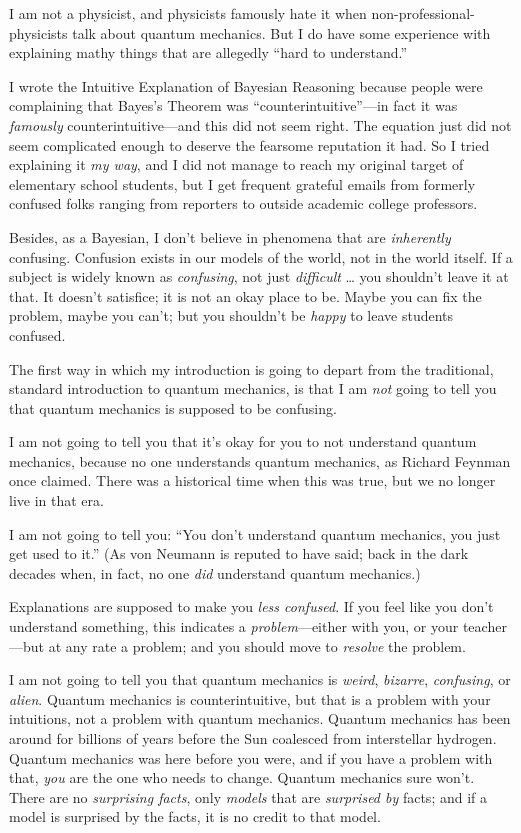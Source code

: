 {
 I am not a physicist, and physicists famously hate it when
non-professional-physicists talk about quantum mechanics. But I do have
some experience with explaining mathy things that are allegedly
``hard to understand.''}

{
 I wrote the Intuitive Explanation of Bayesian Reasoning because
people were complaining that Bayes's Theorem was
``counterintuitive''---in fact it
was \textit{famously} counterintuitive---and this did not seem right.
The equation just did not seem complicated enough to deserve the
fearsome reputation it had. So I tried explaining it \textit{my way},
and I did not manage to reach my original target of elementary school
students, but I get frequent grateful emails from formerly confused
folks ranging from reporters to outside academic college professors.}

{
 Besides, as a Bayesian, I don't believe in
phenomena that are \textit{inherently} confusing. Confusion exists in
our models of the world, not in the world itself. If a subject is
widely known as \textit{confusing}, not just \textit{difficult} \ldots
you shouldn't leave it at that. It
doesn't satisfice; it is not an okay place to be. Maybe
you can fix the problem, maybe you can't; but you
shouldn't be \textit{happy} to leave students
confused.}

{
 The first way in which my introduction is going to depart from the
traditional, standard introduction to quantum mechanics, is that I am
\textit{not} going to tell you that quantum mechanics is supposed to be
confusing.}

{
 I am not going to tell you that it's okay for you
to not understand quantum mechanics, because no one understands quantum
mechanics, as Richard Feynman once claimed. There was a historical time
when this was true, but we no longer live in that era.}

{
 I am not going to tell you: ``You
don't understand quantum mechanics, you just get used
to it.'' (As von Neumann is reputed to have said;
back in the dark decades when, in fact, no one \textit{did} understand
quantum mechanics.)}

{
 Explanations are supposed to make you \textit{less confused}. If
you feel like you don't understand something, this
indicates a \textit{problem}{}---either with you, or your teacher---but
at any rate a problem; and you should move to \textit{resolve} the
problem.}

{
 I am not going to tell you that quantum mechanics is
\textit{weird}, \textit{bizarre}, \textit{confusing}, or
\textit{alien}. Quantum mechanics is counterintuitive, but that is a
problem with your intuitions, not a problem with quantum mechanics.
Quantum mechanics has been around for billions of years before the Sun
coalesced from interstellar hydrogen. Quantum mechanics was here before
you were, and if you have a problem with that, \textit{you} are the one
who needs to change. Quantum mechanics sure won't.
There are no \textit{surprising facts}, only \textit{models} that are
\textit{surprised by} facts; and if a model is surprised by the facts,
it is no credit to that model.}

